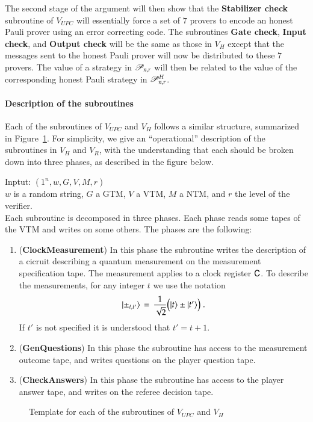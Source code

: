 The second stage of the argument will then show that the \textbf{Stabilizer check} subroutine of $V_{UPC}$ will essentially force a set of $7$ provers to encode an honest Pauli prover using an error correcting code. The subroutines \textbf{Gate check}, \textbf{Input check}, and \textbf{Output check} will be the same as those in $V_H$ except that the messages sent to the honest Pauli prover will now be distributed to these $7$ provers. The value of a strategy in $\mathscr{P}_{n,r}$ will then be related to the value of the corresponding honest Pauli strategy in $\mathscr{P}^H_{n,r}$.


\paragraph{Description of the subroutines}

Each of the subroutines of $V_{UPC}$ and $V_H$ follows a similar structure, summarized in Figure~\ref{fig:check_structure}. For simplicity, we give an ``operational'' description of the subroutines in $V_H$ and $V_R$, with the understanding that each should be broken down into three phases, as described in the figure below.

\vspace{10pt}
\begin{center}
\begin{mdframed}
Inptut: $(1^n,w,G,V,M,r)$\\
  $w$ is a random string, $G$ a GTM, $V$ a VTM, $M$ a NTM, and $r$ the level of the verifier.\\
Each subroutine is decomposed in three phases. Each phase reads some tapes of the VTM and writes on some others. The phases are the following: 
	\begin{enumerate}
		\item (\textbf{ClockMeasurement}) In this phase the subroutine writes the description of a cicruit describing a quantum measurement on the measurement specification tape. The measurement applies to a clock register ${\mathsf{C}}$. To describe the measurements, for any integer $t$ we use the notation 
$$|\pm_{t,t'}\rangle \,=\, \frac{1}{\sqrt{2}}\big(|t\rangle\pm|t'\rangle\big)\;.$$
If $t'$ is not specified it is understood that $t'=t+1$.
	\item (\textbf{GenQuestions}) In this phase the subroutine has access to the measurement outcome tape, and writes questions on the player question tape. 
	\item (\textbf{CheckAnswers}) In this phase the subroutine has access to the player answer tape, and writes on the referee decision tape. 
	\end{enumerate}    
\end{mdframed}

\end{center}
\begin{figure}[H]
\caption{Template for each of the subroutines of $V_{UPC}$ and $V_H$}
\label{fig:check_structure}
\end{figure}

